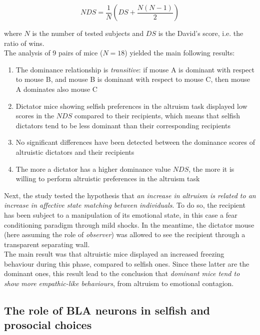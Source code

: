 \documentclass[a4paper]{article}
\begin{document}
\begin{equation}
NDS = \frac{1}{N}\left(DS + \frac{N(N-1)}{2}\right)
\end{equation}

where $N$ is the number of tested subjects and $DS$ is the David's score, i.e. the ratio of wins.\\
The analysis of 9 pairs of mice ($N=18$) yielded the main following results:

\begin{enumerate}
	\item The dominance relationship is \textit{transitive}: if mouse A is dominant with respect to mouse B, and mouse B is dominant with respect to mouse C, then mouse A dominates also mouse C 
	
	\item Dictator mice showing selfish preferences in the altruism task displayed low scores in the $NDS$ compared to their recipients, which means that selfish dictators  tend to be less dominant than their corresponding recipients
	
	\item No significant differences have been detected between the dominance scores of altruistic dictators and their recipients
	
	\item The more a dictator has a higher dominance value $NDS$, the more it is willing to perform altruistic preferences in the altruism task
	
\end{enumerate}

Next, the study tested the hypothesis that \textit{an increase in altruism is related to an increase in affective state matching between individuals}. To do so, the recipient has been subject to a manipulation of its emotional state, in this case a fear conditioning paradigm through mild shocks. In the meantime, the dictator mouse (here assuming the role of \textit{observer}) was allowed to see the recipient through a transparent separating wall.\\
The main result was that altruistic mice displayed an increased freezing behaviour during this phase, compared to selfish ones. Since these latter are the dominant ones, this result lead to the conclusion that \textit{dominant mice tend to show more empathic-like behaviours}, from altruism to emotional contagion.

\subsection{The role of BLA neurons in selfish and prosocial choices}
\end{document}
